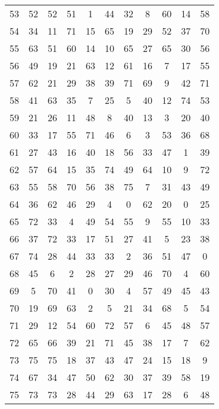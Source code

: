 \begin{table}
\begin{tabular}{c c c c c c c c c c c }
53 & 52 & 52 & 51 & 1 & 44 & 32 & 8 & 60 & 14 & 58 \\
54 & 34 & 11 & 71 & 15 & 65 & 19 & 29 & 52 & 37 & 70 \\
55 & 63 & 51 & 60 & 14 & 10 & 65 & 27 & 65 & 30 & 56 \\
56 & 49 & 19 & 21 & 63 & 12 & 61 & 16 & 7 & 17 & 55 \\
57 & 62 & 21 & 29 & 38 & 39 & 71 & 69 & 9 & 42 & 71 \\
58 & 41 & 63 & 35 & 7 & 25 & 5 & 40 & 12 & 74 & 53 \\
59 & 21 & 26 & 11 & 48 & 8 & 40 & 13 & 3 & 20 & 40 \\
60 & 33 & 17 & 55 & 71 & 46 & 6 & 3 & 53 & 36 & 68 \\
61 & 27 & 43 & 16 & 40 & 18 & 56 & 33 & 47 & 1 & 39 \\
62 & 57 & 64 & 15 & 35 & 74 & 49 & 64 & 10 & 9 & 72 \\
63 & 55 & 58 & 70 & 56 & 38 & 75 & 7 & 31 & 43 & 49 \\
64 & 36 & 62 & 46 & 29 & 4 & 0 & 62 & 20 & 0 & 25 \\
65 & 72 & 33 & 4 & 49 & 54 & 55 & 9 & 55 & 10 & 33 \\
66 & 37 & 72 & 33 & 17 & 51 & 27 & 41 & 5 & 23 & 38 \\
67 & 74 & 28 & 44 & 33 & 33 & 2 & 36 & 51 & 47 & 0 \\
68 & 45 & 6 & 2 & 28 & 27 & 29 & 46 & 70 & 4 & 60 \\
69 & 5 & 70 & 41 & 0 & 30 & 4 & 57 & 49 & 45 & 43 \\
70 & 19 & 69 & 63 & 2 & 5 & 21 & 34 & 68 & 5 & 54 \\
71 & 29 & 12 & 54 & 60 & 72 & 57 & 6 & 45 & 48 & 57 \\
72 & 65 & 66 & 39 & 21 & 71 & 45 & 38 & 17 & 7 & 62 \\
73 & 75 & 75 & 18 & 37 & 43 & 47 & 24 & 15 & 18 & 9 \\
74 & 67 & 34 & 47 & 50 & 62 & 30 & 37 & 39 & 58 & 19 \\
75 & 73 & 73 & 28 & 44 & 29 & 63 & 17 & 28 & 6 & 48 \\
\hline
\end{tabular}
\end{table}